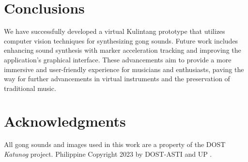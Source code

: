 \documentclass[10pt,a4paper,twoside]{article}
\begin{document}
\section{Conclusions}
We have successfully developed a virtual Kulintang prototype that utilizes computer vision techniques for synthesizing gong sounds. Future work includes enhancing sound synthesis with marker acceleration tracking and improving the application's graphical interface. These advancements aim to provide a more immersive and user-friendly experience for musicians and enthusiasts, paving the way for further advancements in virtual instruments and the preservation of traditional music.

\section*{Acknowledgments}
All gong sounds and images used in this work are a property of the DOST \emph{Katunog} project. Philippine Copyright 2023 by DOST-ASTI and UP \cite{philippine_copyright_2023_by_dost-asti_and_up_katunog_2019}.



\end{document}
